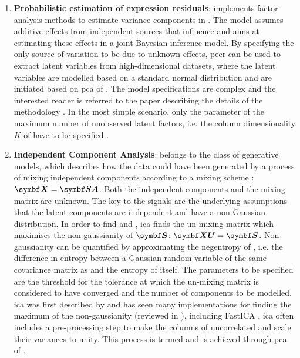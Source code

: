 \begin{enumerate}
\item\textbf{Probabilistic estimation of expression residuals}:  implements factor analysis methods to estimate variance components in . The model assumes additive effects from independent sources that influence  and aims at estimating these effects in a joint Bayesian inference model.  By specifying the only source of variation to be due to unknown effects, \gls{peer} can be used to extract latent variables from high-dimensional datasets, where the latent variables are modelled based on a standard normal distribution and are initiated based on \gls{pca} of . The model specifications are complex and the interested reader is referred to the paper describing the details of the methodology \citep{Stegle2010}. In the most simple scenario, only the parameter of the maximum number of unobserved latent factors, i.e. the column dimensionality \(K\) of  have to be specified \citep{Stegle2012}. 

\item\textbf{Independent Component Analysis}:   belongs to the class of generative models, which describes how the data  could have been generated by a process of mixing independent components  according to a mixing scheme : \(\mat{X} = \mat{SA}\). Both the independent components and the mixing matrix are unknown. The key to  the signals are the underlying assumptions that the latent components are independent and have a non-Gaussian distribution. In order to find  and , \gls{ica} finds the un-mixing matrix  which maximises the non-gaussianity of \(\mat{S}\): \(\mat{XU}=\mat{S}\). Non-gaussianity can be quantified by approximating the negentropy of , i.e. the difference in entropy between a Gaussian random variable of the same covariance matrix as  and the entropy of  itself. The parameters to be specified are the threshold for the tolerance at which the un-mixing matrix is considered to have converged and the number of components to be modelled. \gls{ica} was first described by \citet{Herault1986} and has seen many implementations for finding the maximum of the non-gaussianity (reviewed in \citep{Comon1994}), including FastICA \citep{Hyvarinen2000}. \gls{ica} often includes a pre-processing step to make the columns of  uncorrelated and scale their variances to unity. This process is termed  and is achieved through \gls{pca} of . 


\end{enumerate}
